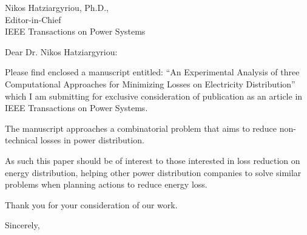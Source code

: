 \documentclass{letter}
\begin{document}
\begin{letter}{
Nikos Hatziargyriou, Ph.D.,\\
Editor-in-Chief\\
IEEE Transactions on Power Systems
}

\opening{Dear Dr. Nikos Hatziargyriou:}

Please find enclosed a manuscript entitled:
``An Experimental Analysis of three Computational Approaches for Minimizing Losses on Electricity Distribution''
which I am submitting for exclusive consideration of publication as an article in IEEE Transactions on Power Systems.

The manuscript approaches a combinatorial problem that aims to reduce
non-technical losses in power distribution.

As such this paper should be of interest to those interested in loss
reduction on energy distribution, helping other power distribution companies to
solve similar problems when planning actions to reduce energy loss.

Thank you for your consideration of our work.

\closing{Sincerely,}


\end{letter}
\end{document}
